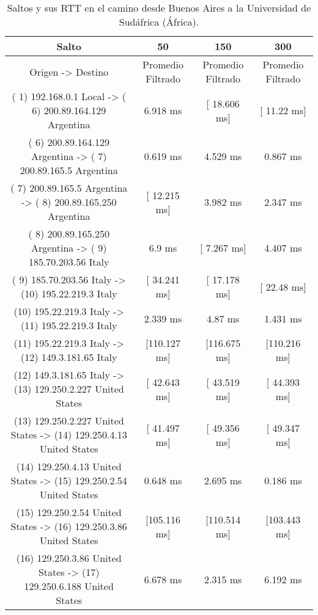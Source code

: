 \begin{table}[]
\centering
\caption{Saltos y sus RTT en el camino desde Buenos Aires a la Universidad de Sudáfrica (África).}
\begin{tabular}{ | c | c | c | c | }
	\hline 
Salto	& 50	& 150	& 300 \\ \hline
Origen                ->               Destino               	               & Promedio Filtrado &  Promedio Filtrado&	Promedio Filtrado \\ \hline
( 1) 192.168.0.1     Local           -> ( 6) 200.89.164.129  Argentina    &  	     6.918 ms   &	  [ 18.606 ms]  	 & [  11.22 ms]   \\ \hline
( 6) 200.89.164.129  Argentina       -> ( 7) 200.89.165.5    Argentina    &  	     0.619 ms   &	     4.529 ms   	 &    0.867 ms    \\ \hline
( 7) 200.89.165.5    Argentina       -> ( 8) 200.89.165.250  Argentina    &  	  [ 12.215 ms]  &	     3.982 ms   	 &    2.347 ms    \\ \hline
( 8) 200.89.165.250  Argentina       -> ( 9) 185.70.203.56   Italy        &  	       6.9 ms   &	  [  7.267 ms]  	 &    4.407 ms    \\ \hline
( 9) 185.70.203.56   Italy           -> (10) 195.22.219.3    Italy        &  	  [ 34.241 ms]  &	  [ 17.178 ms]  	 & [  22.48 ms]   \\ \hline
(10) 195.22.219.3    Italy           -> (11) 195.22.219.3    Italy        &  	     2.339 ms   &	      4.87 ms   	 &    1.431 ms    \\ \hline
(11) 195.22.219.3    Italy           -> (12) 149.3.181.65    Italy        &  	  [110.127 ms]  &	  [116.675 ms]  	 & [110.216 ms]   \\ \hline
(12) 149.3.181.65    Italy           -> (13) 129.250.2.227   United States&  	  [ 42.643 ms]  &	  [ 43.519 ms]  	 & [ 44.393 ms]   \\ \hline
(13) 129.250.2.227   United States   -> (14) 129.250.4.13    United States&  	  [ 41.497 ms]  &	  [ 49.356 ms]  	 & [ 49.347 ms]   \\ \hline
(14) 129.250.4.13    United States   -> (15) 129.250.2.54    United States&  	     0.648 ms   &	     2.695 ms   	 &    0.186 ms    \\ \hline
(15) 129.250.2.54    United States   -> (16) 129.250.3.86    United States&  	  [105.116 ms]  &	  [110.514 ms]  	 & [103.443 ms]   \\ \hline
(16) 129.250.3.86    United States   -> (17) 129.250.6.188   United States&  	     6.678 ms   &	     2.315 ms   	 &    6.192 ms    \\ \hline

\end{tabular}
\end{table}
